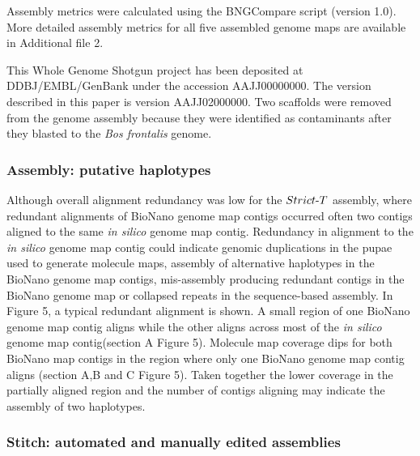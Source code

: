 \documentclass{bmcart}
\begin{document}
Assembly metrics were calculated using the BNGCompare script (version 1.0). More detailed assembly metrics for all five assembled genome maps are available in Additional file 2.

This Whole Genome Shotgun project has been deposited at DDBJ/EMBL/GenBank under the accession AAJJ00000000. The version described in this paper is version AAJJ02000000. Two scaffolds were removed from the genome assembly because they were identified as contaminants after they blasted to the \textit{Bos frontalis} genome.

\subsubsection*{Assembly: putative haplotypes}

Although overall alignment redundancy was low for the $Strict\textnormal{-}T$ assembly, where redundant alignments of BioNano genome map contigs occurred often two contigs aligned to the same \textit{in silico} genome map contig. Redundancy in alignment to the \textit{in silico} genome map contig could indicate genomic duplications in the pupae used to generate molecule maps, assembly of alternative haplotypes in the BioNano genome map contigs, mis-assembly producing redundant contigs in the BioNano genome map or collapsed repeats in the sequence-based assembly. In Figure 5, a typical redundant alignment is shown. A small region of one BioNano genome map contig aligns while the other aligns across most of the \textit{in silico} genome map contig(section A Figure 5). Molecule map coverage dips for both BioNano map contigs in the region where only one BioNano genome map contig aligns (section A,B and C Figure 5). Taken together the lower coverage in the partially aligned region and the number of contigs aligning may indicate the assembly of two haplotypes. 

\subsubsection*{Stitch: automated and manually edited assemblies}
\end{document}
